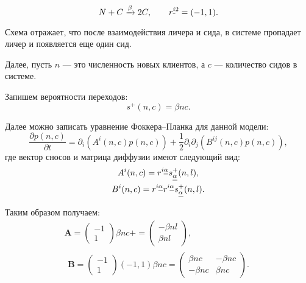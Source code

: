 \documentclass[floatfix,
showkeys,
twocolumn, nofootinbib, superscriptaddress, ]{revtex4-1}
\newcommand{\crd}[1]{\underline{\vphantom{j}{#1}}}
\begin{document}
\begin{equation} 
\label{bt:1}
N+C \xrightarrow{\beta } 2C, \qquad r^{\crd{i}2}=(-1,1).
\end{equation}

Схема отражает, что после взаимодействия личера и сида, в системе
пропадает личер и появляется еще один сид.

Далее, пусть $n$ --- это численность новых клиентов, а $c$ ---
количество сидов в системе.

Запишем вероятности переходов:
\begin{equation} 
\label{bt:2}
s^{+} (n,c) = \beta nc.
\end{equation}

Далее можно записать уравнение Фоккера--Планка для данной модели:
\begin{equation} 
\label{bt:3}
\frac{\partial p(n,c)}{\partial t} = 
{\partial_i} (A^i(n,c) p(n,c))
+\frac{1}{2} {\partial_i \partial_j} (B^{ij}(n,c) p(n,c)),
\end{equation}
где вектор сносов и матрица диффузии имеют следующий вид:
\begin{equation}
  \begin{gathered}
     A^i(n,c)= r^{i\crd{\alpha}}s^+_{\crd{\alpha}} (n,l) ,\\
     B^i(n,c) = r^{i\crd{\alpha}}r^{i\crd{\alpha}} s^+_{\crd{\alpha}} (n,l).
  \end{gathered}
\end{equation}

Таким образом получаем:
\begin{equation} 
\label{bt:4}
  \begin{gathered}
    \mathbf A =
    \begin{pmatrix}
      -1\\
      1
    \end{pmatrix}
    \beta n c +
     =
    \begin{pmatrix}
      - \beta n l\\
      \beta n l 
    \end{pmatrix}, \\
    \begin{multlined}
      \mathbf B =
       \begin{pmatrix}
        -1\\
        1
      \end{pmatrix}
      (-1,1) \beta n c  = 
      \begin{pmatrix}
         \beta n c & - \beta n c \\
        - \beta n c& \beta n c
      \end{pmatrix}.
    \end{multlined}
  \end{gathered}
\end{equation}
\end{document}
